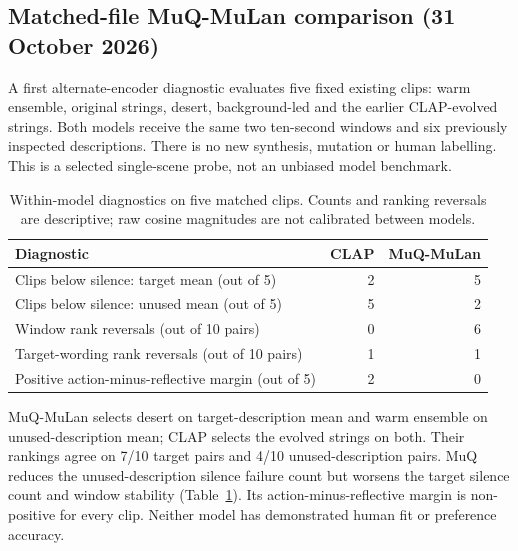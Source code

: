 \subsection{Matched-file MuQ-MuLan comparison (31 October 2026)}

A first alternate-encoder diagnostic evaluates five fixed existing clips: warm ensemble, original strings, desert, background-led and the earlier CLAP-evolved strings. Both models receive the same two ten-second windows and six previously inspected descriptions. There is no new synthesis, mutation or human labelling. This is a selected single-scene probe, not an unbiased model benchmark.

\begin{table}[ht]

\centering\small

\caption{Within-model diagnostics on five matched clips. Counts and ranking reversals are descriptive; raw cosine magnitudes are not calibrated between models.}

\begin{tabular}{p{8.2cm}rr}

\toprule

Diagnostic & CLAP & MuQ-MuLan\\

\midrule

Clips below silence: target mean (out of 5) & 2 & 5 \\

Clips below silence: unused mean (out of 5) & 5 & 2 \\

Window rank reversals (out of 10 pairs) & 0 & 6 \\

Target-wording rank reversals (out of 10 pairs) & 1 & 1 \\

Positive action-minus-reflective margin (out of 5) & 2 & 0 \\

\bottomrule

\end{tabular}

\label{tab:muq}

\end{table}

MuQ-MuLan selects desert on target-description mean and warm ensemble on unused-description mean; CLAP selects the evolved strings on both. Their rankings agree on 7/10 target pairs and 4/10 unused-description pairs. MuQ reduces the unused-description silence failure count but worsens the target silence count and window stability (Table~\ref{tab:muq}). Its action-minus-reflective margin is non-positive for every clip. Neither model has demonstrated human fit or preference accuracy.

